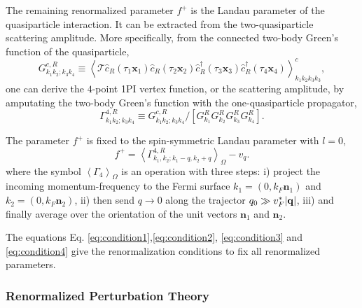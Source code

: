 \documentclass[reprint,amsmath,amssymb,aps,prb]{revtex4-1}
\begin{document}
The remaining renormalized parameter $f^+$ is the Landau parameter of the quasiparticle interaction. It can be extracted from the two-quasiparticle scattering amplitude.
More specifically,  from the connected two-body Green's function of the quasiparticle,
\begin{equation}
    G^{c,R}_{k_1k_2; k_3k_4}\equiv \left< \mathcal{T} \hat{c}_R(\tau_1 \mathbf{x}_1)\hat{c}_R(\tau_2 \mathbf{x}_2) \hat{c}_R^\dag(\tau_3 \mathbf{x}_3)\hat{c}_R^\dag(\tau_4 \mathbf{x}_4) \right>^c_{k_1 k_2 k_3 k_3},
\end{equation}
one can derive the $4$-point 1PI vertex function, or the scattering amplitude, by amputating the two-body Green's function with the one-quasiparticle propagator,
\begin{equation}
    \Gamma^{4,R}_{k_1k_2;k_3k_4}\equiv G^{c,R}_{k_1k_2; k_3k_4}/\left[G^R_{k_1}G^R_{k_2}G^R_{k_3}G^R_{k_4}\right].
\end{equation}

The parameter $f^+$ is fixed to the spin-symmetric Landau parameter with $l=0$,
\begin{equation}
    \label{eq:condition4}
    f^+ = \left<\Gamma^{4,R}_{k_1, k_2; k_1-q, k_2+q}\right>_\Omega-v_q.
\end{equation}
where the symbol $\left<\Gamma_4\right>_\Omega$ is an operation with three steps:
i) project the incoming momentum-frequency to the Fermi surface $k_1=(0, k_F\mathbf{n}_1)$ and $k_2=(0, k_F\mathbf{n}_2)$,
ii) then send $q\rightarrow 0$ along the trajector $q_0 \gg v_F^*|\mathbf{q}|$,
iii) and finally average over the orientation of the unit vectors $\mathbf{n}_1$ and $\mathbf{n}_2$.

The equations Eq. \eqref{eq:condition1},\eqref{eq:condition2}, \eqref{eq:condition3} and \eqref{eq:condition4} give the renormalization conditions to fix all renormalized parameters.




\subsubsection{Renormalized Perturbation Theory}
\end{document}
